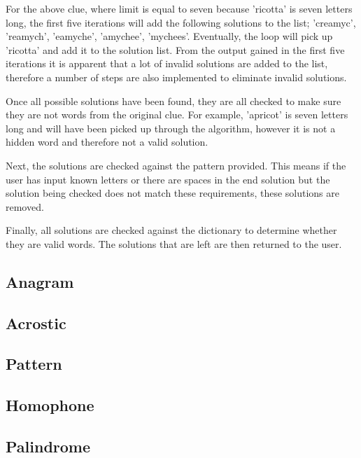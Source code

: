 For the above clue, where limit is equal to seven because 'ricotta' is seven letters 
long, the first five iterations will add the following solutions to the list; 'creamyc', 
'reamych', 'eamyche', 'amychee', 'mychees'. Eventually, the loop will pick up 
'ricotta' and add it to the solution list. From the output gained in the first five 
iterations it is apparent that a lot of invalid solutions are added to the list, therefore
a number of steps are also implemented to eliminate invalid solutions.

Once all possible solutions have been found, they are all checked to make sure they are
not words from the original clue. For example, 'apricot' is seven letters long and will 
have been picked up through the algorithm, however it is not a hidden word and therefore 
not a valid solution. 

Next, the solutions are checked against the pattern provided. This means if the user 
has input known letters or there are spaces in the end solution but the solution being 
checked does not match these requirements, these solutions are removed. 

Finally, all solutions are checked against the dictionary to determine whether they 
are valid words. The solutions that are left are then returned to the user.   

\subsection{Anagram}

\subsection{Acrostic}

\subsection{Pattern}

\subsection{Homophone}

\subsection{Palindrome}

